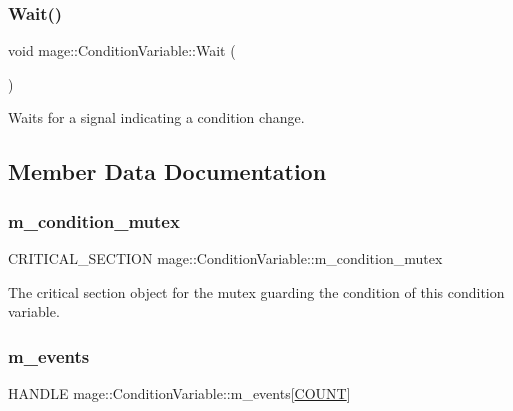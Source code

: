 \subsubsection{\texorpdfstring{Wait()}{Wait()}}
{\footnotesize\ttfamily void mage\+::\+Condition\+Variable\+::\+Wait (\begin{DoxyParamCaption}{ }\end{DoxyParamCaption})\hspace{0.3cm}{\ttfamily [noexcept]}}

Waits for a signal indicating a condition change. 

\subsection{Member Data Documentation}
\hypertarget{structmage_1_1_condition_variable_ab5ff870b2881a1979ccaec986d762441}{}\label{structmage_1_1_condition_variable_ab5ff870b2881a1979ccaec986d762441} 
\subsubsection{\texorpdfstring{m\+\_\+condition\+\_\+mutex}{m\_condition\_mutex}}
{\footnotesize\ttfamily C\+R\+I\+T\+I\+C\+A\+L\+\_\+\+S\+E\+C\+T\+I\+ON mage\+::\+Condition\+Variable\+::m\+\_\+condition\+\_\+mutex\hspace{0.3cm}{\ttfamily [private]}}

The critical section object for the mutex guarding the condition of this condition variable. \hypertarget{structmage_1_1_condition_variable_a00691d5e29735da356f577bb5522017d}{}\label{structmage_1_1_condition_variable_a00691d5e29735da356f577bb5522017d} 
\subsubsection{\texorpdfstring{m\+\_\+events}{m\_events}}
{\footnotesize\ttfamily H\+A\+N\+D\+LE mage\+::\+Condition\+Variable\+::m\+\_\+events\mbox{[}\hyperlink{structmage_1_1_condition_variable_ae7627253bf4faebc0aae84a77920d195a553680ab09f088489b7d9f3cef9a5e14}{C\+O\+U\+NT}\mbox{]}\hspace{0.3cm}{\ttfamily [private]}}

